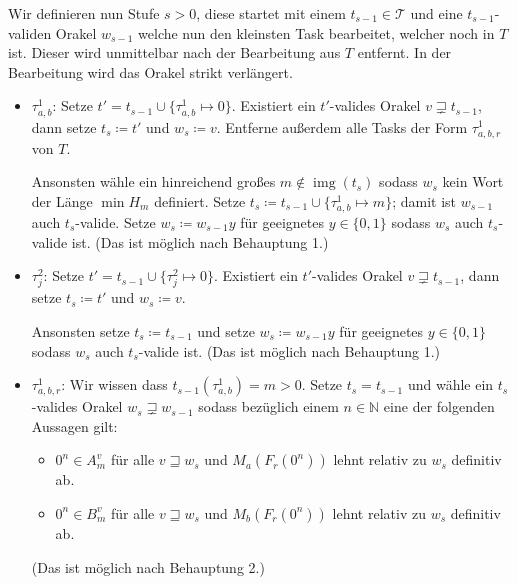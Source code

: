\documentclass[nofonts]{uebung}
\DeclareMathOperator{\img}{img}
\begin{document}
Wir definieren nun Stufe $s>0$, diese startet mit einem $t_{s-1}\in\mathcal T$ und eine $t_{s-1}$-validen Orakel $w_{s-1}$ welche nun den kleinsten Task bearbeitet, welcher noch in $T$ ist. Dieser wird unmittelbar nach der Bearbeitung aus $T$ entfernt. In der Bearbeitung wird das Orakel strikt verlängert.
\begin{itemize}

    \item $\tau^1_{a,b}$: Setze $t'=t_{s-1}\cup\{\tau^1_{a,b}\mapsto 0\}$. Existiert ein $t'$-valides Orakel $v\sqsupsetneq t_{s-1}$, dann setze $t_s\coloneqq t'$ und $w_s\coloneqq v$. Entferne außerdem alle Tasks der Form $\tau^1_{a,b,r}$ von $T$.

        Ansonsten wähle ein hinreichend großes $m\not\in \img(t_s)$ sodass $w_s$ kein Wort der Länge $\min H_m$ definiert. Setze $t_s\coloneqq t_{s-1}\cup \{ \tau^1_{a,b}\mapsto m \}$; damit ist $w_{s-1}$ auch $t_s$-valide. Setze $w_s\coloneqq w_{s-1}y$ für geeignetes $y\in\{0,1\}$ sodass $w_s$ auch $t_s$-valide ist. (Das ist möglich nach Behauptung 1.)

    \item $\tau^2_j$: Setze $t'=t_{s-1}\cup\{\tau^2_j\mapsto 0\}$. Existiert ein $t'$-valides Orakel $v\sqsupsetneq t_{s-1}$, dann setze $t_s\coloneqq t'$ und $w_s\coloneqq v$.

        Ansonsten setze $t_s\coloneqq t_{s-1}$ und setze $w_s\coloneqq w_{s-1}y$ für geeignetes $y\in\{0,1\}$ sodass $w_s$ auch $t_s$-valide ist. (Das ist möglich nach Behauptung 1.)

    \item $\tau^1_{a,b,r}$: Wir wissen dass $t_{s-1}(\tau^1_{a,b})=m>0$. Setze $t_s=t_{s-1}$ und wähle ein $t_s$-valides Orakel $w_s\sqsupsetneq w_{s-1}$ sodass bezüglich einem $n\in\mathbb N$ eine der folgenden Aussagen gilt:
        \begin{itemize}[nosep,endpenalty=10000]
            \item $0^n\in A_m^v$ für alle $v\sqsupseteq w_s$ und $M_a(F_r(0^n))$ lehnt relativ zu $w_s$ definitiv ab.
            \item $0^n\in B_m^v$ für alle $v\sqsupseteq w_s$ und $M_b(F_r(0^n))$ lehnt relativ zu $w_s$ definitiv ab.
        \end{itemize} (Das ist möglich nach Behauptung 2.)
\end{itemize}
\end{document}
